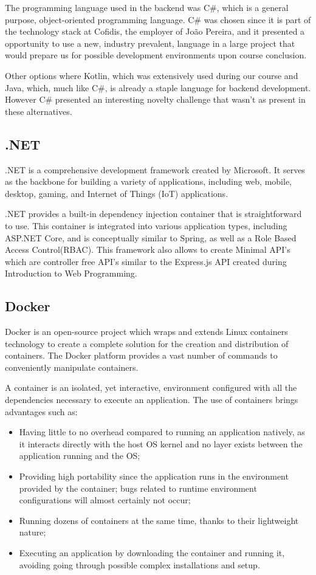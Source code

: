 The programming language used in the backend was C\#, which is a general purpose, object-oriented programming language. C\# was chosen since it is part of the technology stack at Cofidis, the employer of João Pereira, and it presented a opportunity to use a new, industry prevalent, language in  a large project that would prepare us for possible development environments upon course conclusion.

Other options where Kotlin, which was extensively used during our course and Java, which, much like C\#, is already a staple language for backend development. However C\# presented an interesting novelty challenge that wasn't as present in these alternatives.

\subsection{.NET}
.NET is a comprehensive development framework created by Microsoft. It serves as the backbone for building a variety of applications, including web, mobile, desktop, gaming, and Internet of Things (IoT) applications.

.NET provides a built-in dependency injection container that is straightforward to use. This container is integrated into various application types, including ASP.NET Core, and is conceptually similar to Spring, as well as a Role Based Access Control(RBAC). This framework also allows to create Minimal API's which are controller free API's similar to the Express.js API created during Introduction to Web Programming.

\subsection{Docker}

Docker is an open-source project which wraps and extends Linux containers technology to create a complete solution for the creation and distribution of containers.
The Docker platform provides a vast number of commands to conveniently manipulate
containers.

A container is an isolated, yet interactive, environment configured with all the dependencies necessary to execute an application. The use of containers brings advantages
such as:
\begin{itemize}
	\item Having little to no overhead compared to running an application natively, as it interacts directly with the host OS kernel and no layer exists between the application running and the OS;
	\item Providing high portability since the application runs in the environment provided by the container; bugs related to runtime environment configurations will almost certainly not occur;
	\item Running dozens of containers at the same time, thanks to their lightweight nature;
	\item Executing an application by downloading the container and running it, avoiding going through possible complex installations and setup.
\end{itemize}

